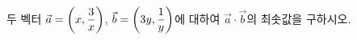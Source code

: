두 벡터 $\vec{a}=\left(x{,}\mkern3mu\mathopen{}\dfrac{3}{x}\right)$, $\vec{b}=\left(3y{,}\mkern3mu\mathopen{}\dfrac{1}{y}\right)$에 대하여 $\vec{a}\cdot\vec{b}$의 최솟값을 구하시오. 
